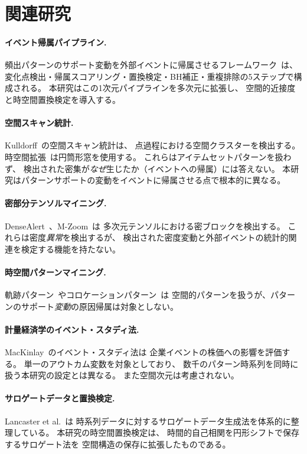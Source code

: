 \section{関連研究}\label{sec:related}

\paragraph{イベント帰属パイプライン.}
頻出パターンのサポート変動を外部イベントに帰属させるフレームワーク~\cite{dsaa2025}は、
変化点検出・帰属スコアリング・置換検定・BH補正・重複排除の5ステップで構成される。
本研究はこの1次元パイプラインを多次元に拡張し、
空間的近接度と時空間置換検定を導入する。

\paragraph{空間スキャン統計.}
Kulldorff~\cite{kulldorff1997spatial}の空間スキャン統計は、
点過程における空間クラスターを検出する。
時空間拡張~\cite{kulldorff2001prospective}は円筒形窓を使用する。
これらはアイテムセットパターンを扱わず、
検出された密集が\emph{なぜ}生じたか（イベントへの帰属）には答えない。
本研究はパターンサポートの変動をイベントに帰属させる点で根本的に異なる。

\paragraph{密部分テンソルマイニング.}
DenseAlert~\cite{shin2017densealert}、M-Zoom~\cite{shin2018mzoom}は
多次元テンソルにおける密ブロックを検出する。
これらは密度\emph{異常}を検出するが、
検出された密度変動と外部イベントの統計的関連を検定する機能を持たない。

\paragraph{時空間パターンマイニング.}
軌跡パターン~\cite{giannotti2007trajectory}やコロケーションパターン~\cite{shekhar2001colocation}は
空間的パターンを扱うが、パターンのサポート\emph{変動}の原因帰属は対象としない。

\paragraph{計量経済学のイベント・スタディ法.}
MacKinlay~\cite{mackinlay1997event}のイベント・スタディ法は
企業イベントの株価への影響を評価する。
単一のアウトカム変数を対象としており、
数千のパターン時系列を同時に扱う本研究の設定とは異なる。
また空間次元は考慮されない。

\paragraph{サロゲートデータと置換検定.}
Lancaster et al.~\cite{lancaster2018surrogate}は
時系列データに対するサロゲートデータ生成法を体系的に整理している。
本研究の時空間置換検定は、
時間的自己相関を円形シフトで保存するサロゲート法を
空間構造の保存に拡張したものである。
